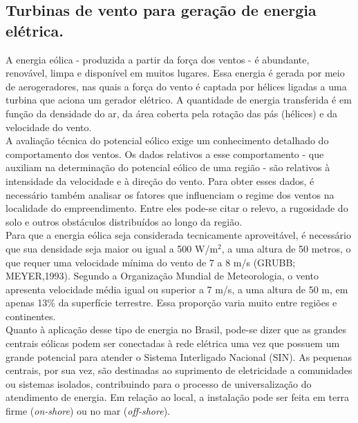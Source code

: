 \subsection{Turbinas de vento para gera\c{c}\~ao de energia el\'etrica.}

A energia e\'olica - produzida a partir da for\c{c}a dos ventos - \'e abundante, renov\'avel, limpa e dispon\'ivel em muitos lugares. Essa energia \'e gerada por meio de aerogeradores, nas quais a for\c{c}a do vento \'e captada por h\'elices ligadas a uma turbina que aciona um gerador el\'etrico. A quantidade de energia transferida \'e em fun\c{c}\~ao da densidade do ar, da \'area coberta pela rota\c{c}\~ao das p\'as (h\'elices) e da velocidade do vento. \\ 

A avalia\c{c}\~ao t\'ecnica do potencial e\'olico exige um conhecimento detalhado do comportamento dos ventos. Os dados relativos a esse comportamento - que auxiliam na determina\c{c}\~ao do potencial e\'olico de uma regi\~ao - s\~ao relativos \`a intensidade da velocidade e \`a dire\c{c}\~ao do vento. Para obter esses dados, \'e necess\'ario tamb\'em analisar os fatores que influenciam o regime dos ventos na localidade do empreendimento. Entre eles pode-se citar o relevo, a rugosidade do solo e outros obst\'aculos distribu\'idos ao longo da regi\~ao. \\ 

Para que a energia e\'olica seja considerada tecnicamente aproveit\'avel, \'e necess\'ario que sua densidade seja maior ou igual a 500 W/m$^{2}$, a uma altura de 50 metros, o que requer uma velocidade m\'inima do vento de 7 a 8 m/s (GRUBB; MEYER,1993). Segundo a Organiza\c{c}\~ao Mundial de Meteorologia, o vento apresenta velocidade m\'edia igual ou superior a 7 m/s, a uma altura de 50 m, em apenas 13\% da superf\'icie terrestre. Essa propor\c{c}\~ao varia muito entre regi\~oes e continentes. \\

Quanto \`a aplica\c{c}\~ao desse tipo de energia no Brasil, pode-se dizer que as grandes centrais e\'olicas podem ser conectadas \`a rede el\'etrica uma vez que possuem um grande potencial para atender o Sistema Interligado Nacional (SIN). As pequenas centrais, por sua vez, s\~ao destinadas ao suprimento de eletricidade a comunidades ou sistemas isolados, contribuindo para o processo de universaliza\c{c}\~ao do atendimento de energia. Em rela\c{c}\~ao ao local, a instala\c{c}\~ao pode ser feita em terra firme (\textit{on-shore}) ou no mar (\textit{off-shore}). \\ 


